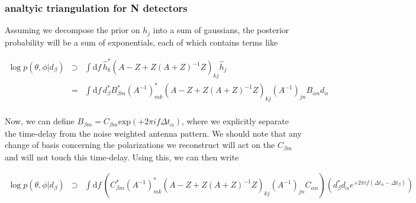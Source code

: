 \documentclass[10pt]{article}
\begin{document}
%

\subsubsection{analtyic triangulation for N detectors}

Assuming we decompose the prior on $h_j$ into a sum of gaussians, the posterior probability will be a sum of exponentials, each of which contains terms like

\begin{eqnarray}
\log p(\theta,\phi|d_\beta) & \supset & \int\mathrm{d}f\, \hat{h}^\ast_k \left( A - Z + Z\left(A+Z\right)^{-1}Z \right)_{kj}\hat{h}_j \\
& = & \int\mathrm{d}f\, d_\beta^\ast B_{\beta m}^\ast \left(A^{-1}\right)_{mk}^\ast \left( A - Z + Z\left(A+Z\right)^{-1}Z \right)_{kj} \left(A^{-1}\right)_{jn} B_{\alpha n} d_\alpha \\
\end{eqnarray}

Now, we can define $B_{\beta m} = C_{\beta m} \mathrm{exp}(+2\pi i f \Delta t_\alpha)$, where we explicitly separate the time-delay from the noise weighted antenna pattern. We should note that any change of basis concerning the polarizations we reconstruct will act on the $C_{\beta m}$ and will not touch this time-delay. Using this, we can then write

\begin{eqnarray}
\log p(\theta,\phi|d_\beta) & \supset & \int\mathrm{d}f\, \left(C_{\beta m}^\ast \left(A^{-1}\right)_{mk}^\ast \left( A - Z + Z\left(A+Z\right)^{-1}Z \right)_{kj} \left(A^{-1}\right)_{jn} C_{\alpha n}\right) \left(d_\beta^\ast d_\alpha e^{+2\pi i f (\Delta t_\alpha - \Delta t_\beta)}\right) \\
\end{eqnarray}
\end{document}
